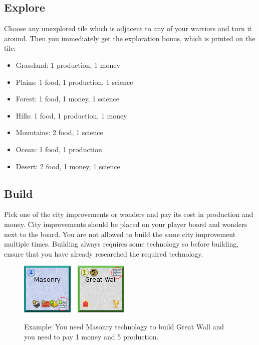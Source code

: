 \documentclass[11pt,a4paper,titlepage]{article}
\begin{document}
{{  }\label{subsec:move}
  \subsection{Explore}{
    Choose any unexplored tile which is adjacent to any of your warriors and
    turn it around. Then you immediately get the exploration bonus, which is
    printed on the tile:
    \begin{itemize}
    \item Grassland: 1 production, 1 money
    \item Plains: 1 food, 1 production, 1 science
    \item Forest: 1 food, 1 money, 1 science
    \item Hills: 1 food, 1 production, 1 money
    \item Mountains: 2 food, 1 science
    \item Ocean: 1 food, 1 production
    \item Desert: 2 food, 1 money, 1 science
    \end{itemize}
  }\label{subsec:explore}
  \subsection{Build}{
    Pick one of the city improvements or wonders and pay its cost in production
    and money. City improvements should be placed on your player board and
    wonders next to the board. You are not allowed to build the same city
    improvement multiple times. Building always requires some technology so
    before building, ensure that you have already researched the required
    technology.

    \begin{figure}[!htb]
      \begin{minipage}[c]{0.2\textwidth}
        \label{fig:tech_irrigation}
        \includegraphics[scale=.6]{doe_example_build.png}
      \end{minipage}\hfill
      \begin{minipage}[c]{0.55\textwidth}
        \captionsetup{labelformat=empty, justification=justified, singlelinecheck=false}
        \caption{Example: You need Masonry technology to build Great Wall and you need to pay 1 money and 5 production.}
      \end{minipage}\hfill
      \label{fig:example_towns}
    \end{figure}

}}
\end{document}
